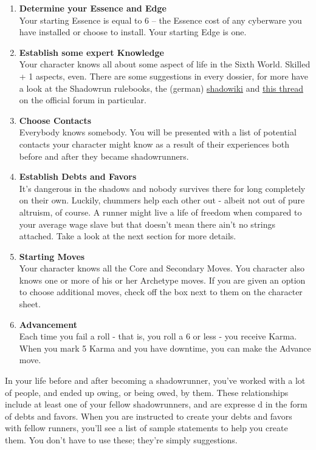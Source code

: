 \begin{enumerate}
    \item \textbf{Determine your Essence and Edge} \\
    Your starting Essence is equal to 6 – the Essence cost of any cyberware you have installed or choose to install. Your starting Edge is one.

    \item \textbf{Establish some expert Knowledge} \\
    Your character knows all about some aspect of life in the Sixth World. Skilled + 1 aspects, even. There are some suggestions in every dossier, for more have a look at the Shadowrun rulebooks, the (german) \textcolor{purple}{\href{https://www.shadowiki.de/Wissensfertigkeit}{shadowiki}} and \textcolor{purple}{\href{https://forums.shadowruntabletop.com/index.php?topic=621.0}{this thread}} on the official forum in particular.
    
    \item \textbf{Choose Contacts} \\
    Everybody knows somebody. You will be presented with a list of potential contacts your character might know as a result of their experiences both before and after they became shadowrunners.
    
    \item \textbf{Establish Debts and Favors} \\
    It's dangerous in the shadows and nobody survives there for long completely on their own. Luckily, chummers help each other out - albeit not out of pure altruism, of course. A runner might live a life of freedom when compared to your average wage slave but that doesn't mean there ain't no strings attached. Take a look at the next section for more details.
    
    \item \textbf{Starting Moves} \\
    Your character knows all the Core and Secondary Moves. You character also knows one or more of his or her Archetype moves. If you are given an option to choose additional moves, check off the box next to them on the character sheet.
    
    \item \textbf{Advancement} \\
    Each time you fail a roll - that is, you roll a 6 or less - you receive Karma. When you mark 5 Karma and you have downtime, you can make the Advance move.
\end{enumerate}


In your life before and after becoming a shadowrunner, you’ve worked with a lot of people, and ended up owing, or being owed, by them. These relationships include at least one of your fellow shadowrunners, and are expresse d in the form of debts and favors. When you are instructed to create your debts and favors with fellow runners, you’ll see a list of sample statements to help you create them. You don’t have to use these; they’re simply suggestions.
    
